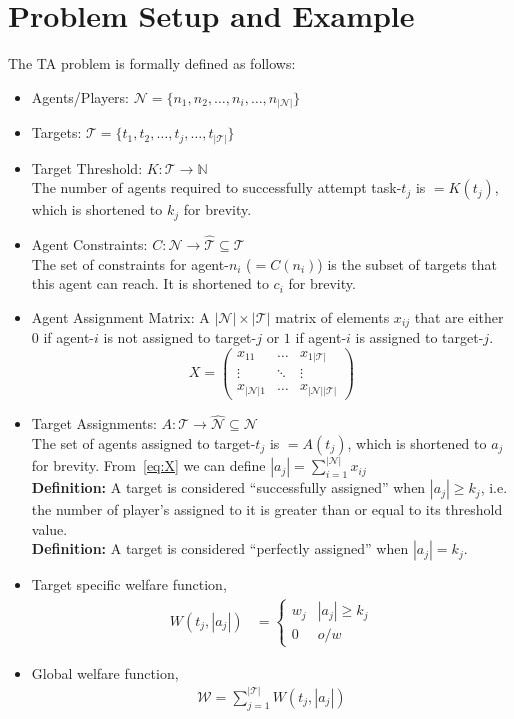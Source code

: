 \documentclass[11pt, onecolumn, compsoc, letterpaper]{article}
\newcommand{\Pl}{\mathcal{N}} %
\newcommand{\Ta}{\mathcal{T}} %
\newcommand{\We}{\mathcal{W}} %
\begin{document}
\section{Problem Setup and Example}
The TA problem is formally defined as follows:
\begin{itemize}
	\item Agents/Players: $\Pl = \{n_1, n_2, \ldots, n_i, \ldots,n_{|\Pl|}\}$
	\item Targets: $\Ta = \{t_1, t_2, \ldots, t_j, \ldots,t_{|\Ta|}\}$
	\item Target Threshold: $K:\Ta \to \mathbb{N}$\\
	The number of agents required to successfully attempt task-$t_j$ is $= K(t_j)$, which is shortened to $k_j$ for brevity.
	
	\item Agent Constraints: $C:\Pl \to \hat{\Ta} \subseteq \Ta$\\
	The set of constraints for agent-$n_i$ ($= C(n_i)$) is the subset of targets that this agent can reach. It is shortened to $c_i$ for brevity.
	\item Agent Assignment Matrix: A $|\Pl| \times |\Ta|$ matrix of elements $x_{ij}$ that are either $0$ if agent-$i$ is not assigned to target-$j$ or $1$ if agent-$i$ is assigned to target-$j$.
	\begin{equation}\label{eq:X}
		X = \left(\begin{array}{ccc}
			x_{11} & \ldots & x_{1|\Ta|}\\
			\vdots & \ddots & \vdots\\
			x_{|\Pl|1} & \ldots & x_{|\Pl||\Ta|}
		\end{array}\right)
	\end{equation}
	\item Target Assignments: $A:\Ta \to \hat{\Pl} \subseteq \Pl$\\
	The set of agents assigned to target-$t_j$ is $= A(t_j)$, which is shortened to $a_j$ for brevity. From~\eqref{eq:X} we can define $|a_j| = \sum\limits_{i = 1}^{|\Pl|} x_{ij}$\\
	\textbf{Definition:} A target is considered ``successfully assigned'' when $|a_j| \geq k_j$, i.e. the number of player's assigned to it is greater than or equal to its threshold value.\\
	\textbf{Definition:} A target is considered ``perfectly assigned'' when $|a_j| = k_j$.
	\item Target specific welfare function,
\begin{align}
	W(t_j, |a_j|) & = \left\{
	\begin{array}{ll}
		w_j & |a_j| \geq k_j\\
		0 & o/w
	\end{array}\right.\label{eq:wf}
\end{align}
	\item Global welfare function,
\begin{align}
	\We = \sum\limits_{j = 1}^{|\Ta|} W(t_j, |a_j|)\label{eq:gwf}
\end{align}
\end{itemize}
\end{document}
